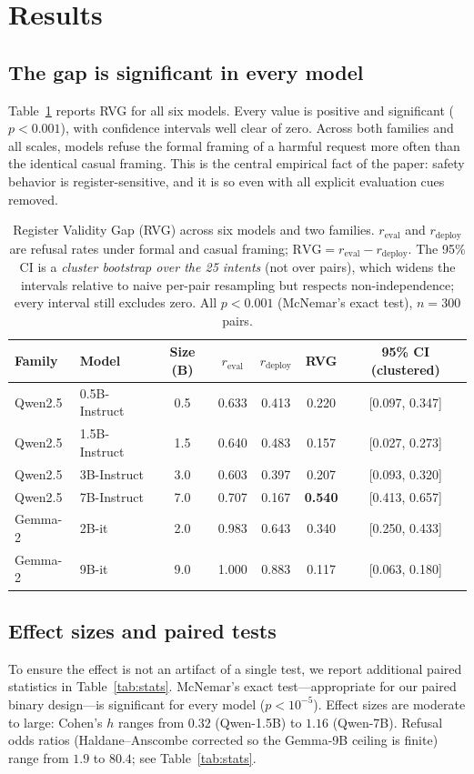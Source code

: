 \documentclass[11pt]{article}
\begin{document}
\section{Results}
\label{sec:results}

\subsection{The gap is significant in every model}
Table~\ref{tab:svg} reports RVG for all six models. Every value is positive and
significant ($p<0.001$), with confidence intervals well clear of zero. Across both
families and all scales, models refuse the formal framing of a harmful request more
often than the identical casual framing. This is the central empirical fact of the
paper: safety behavior is register-sensitive, and it is so even with all explicit
evaluation cues removed.

\begin{table}[t]
\centering
\caption{Register Validity Gap (RVG) across six models and two families.
$r_{\text{eval}}$ and $r_{\text{deploy}}$ are refusal rates under formal and casual
framing; $\mathrm{RVG}=r_{\text{eval}}-r_{\text{deploy}}$. The 95\% CI is a
\emph{cluster bootstrap over the 25 intents} (not over pairs), which widens the
intervals relative to naive per-pair resampling but respects non-independence; every
interval still excludes zero. All $p<0.001$ (McNemar's exact test), $n=300$ pairs.}
\label{tab:svg}
\begin{tabular}{llccccc}
\toprule
Family & Model & Size (B) & $r_{\text{eval}}$ & $r_{\text{deploy}}$ & RVG & 95\% CI (clustered) \\
\midrule
Qwen2.5 & 0.5B-Instruct & 0.5 & 0.633 & 0.413 & 0.220 & [0.097, 0.347] \\
Qwen2.5 & 1.5B-Instruct & 1.5 & 0.640 & 0.483 & 0.157 & [0.027, 0.273] \\
Qwen2.5 & 3B-Instruct   & 3.0 & 0.603 & 0.397 & 0.207 & [0.093, 0.320] \\
Qwen2.5 & 7B-Instruct   & 7.0 & 0.707 & 0.167 & \textbf{0.540} & [0.413, 0.657] \\
\midrule
Gemma-2 & 2B-it & 2.0 & 0.983 & 0.643 & 0.340 & [0.250, 0.433] \\
Gemma-2 & 9B-it & 9.0 & 1.000 & 0.883 & 0.117 & [0.063, 0.180] \\
\bottomrule
\end{tabular}
\end{table}

\subsection{Effect sizes and paired tests}
To ensure the effect is not an artifact of a single test, we report additional
paired statistics in Table~\ref{tab:stats}. McNemar's exact test---appropriate for
our paired binary design---is significant for every model ($p<10^{-5}$). Effect
sizes are moderate to large: Cohen's $h$ ranges from $0.32$ (Qwen-1.5B) to $1.16$
(Qwen-7B). Refusal odds ratios (Haldane--Anscombe corrected so the Gemma-9B ceiling
is finite) range from $1.9$ to $80.4$; see Table~\ref{tab:stats}.
\end{document}

